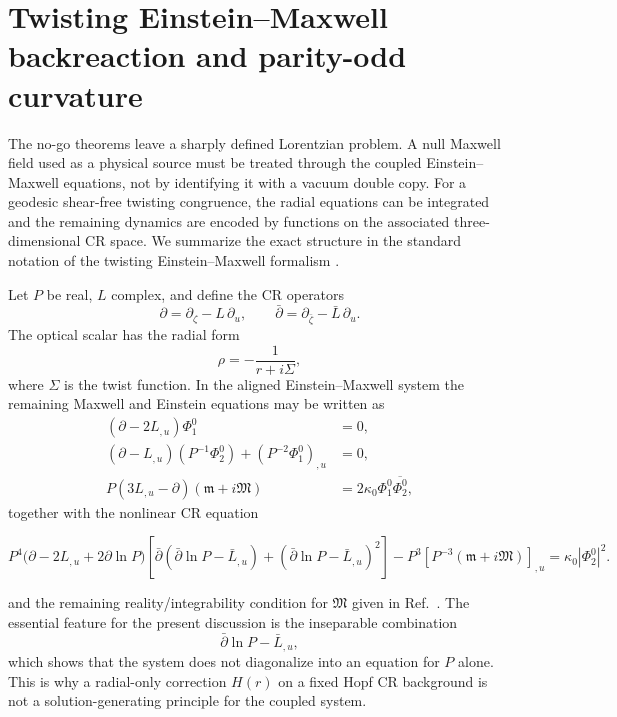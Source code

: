 \documentclass[aps,prd,reprint,nofootinbib,superscriptaddress]{revtex4-2}
\theoremstyle{definition}
\theoremstyle{remark}
\begin{document}
\section{Twisting Einstein--Maxwell backreaction and parity-odd curvature}
\label{sec:crparity}

The no-go theorems leave a sharply defined Lorentzian problem.  A null Maxwell field used as a physical source must be treated through the coupled Einstein--Maxwell equations, not by identifying it with a vacuum double copy.  For a geodesic shear-free twisting congruence, the radial equations can be integrated and the remaining dynamics are encoded by functions on the associated three-dimensional CR space.  We summarize the exact structure in the standard notation of the twisting Einstein--Maxwell formalism \cite{Stephani2003,NurowskiTafel1992}.

Let $P$ be real, $L$ complex, and define the CR operators
\begin{equation}
 \partial=\partial_\zeta-L\,\partial_u,
 \qquad
 \bar\partial=\partial_{\bar\zeta}-\bar L\,\partial_u.
 \label{eq:CRoperators}
\end{equation}
The optical scalar has the radial form
\begin{equation}
 \rho=-\frac{1}{r+i\Sigma},
 \label{eq:rhoradial}
\end{equation}
where $\Sigma$ is the twist function.  In the aligned Einstein--Maxwell system the remaining Maxwell and Einstein equations may be written as \cite{Stephani2003}
\begin{align}
 (\partial-2L_{,u})\Phi_1^0&=0,
 \label{eq:CREM1}\\
 (\partial-L_{,u})(P^{-1}\Phi_2^0)+(P^{-2}\Phi_1^0)_{,u}&=0,
 \label{eq:CREM2}\\
 P(3L_{,u}-\partial)(\mathfrak m+i\mathfrak M)
 &=2\kappa_0\Phi_1^0\overline{\Phi_2^0},
 \label{eq:CREM3}
\end{align}
together with the nonlinear CR equation
\begin{widetext}
\begin{equation}
P^4\bigl(\partial-2L_{,u}+2\partial\ln P\bigr)
\left[
\bar\partial(\bar\partial\ln P-\bar L_{,u})
+(\bar\partial\ln P-\bar L_{,u})^2
\right]
-P^3\left[P^{-3}(\mathfrak m+i\mathfrak M)\right]_{,u}
=\kappa_0|\Phi_2^0|^2.
\label{eq:CREM4}
\end{equation}
\end{widetext}
and the remaining reality/integrability condition for $\mathfrak M$ given in Ref.~\cite{Stephani2003}.  The essential feature for the present discussion is the inseparable combination
\begin{equation}
 \bar\partial\ln P-\bar L_{,u},
 \label{eq:coupledCRcombination}
\end{equation}
which shows that the system does not diagonalize into an equation for $P$ alone.  This is why a radial-only correction $H(r)$ on a fixed Hopf CR background is not a solution-generating principle for the coupled system.
\end{document}
